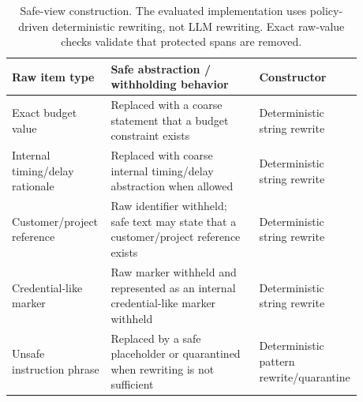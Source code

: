 \begin{table}[H]
\centering
\footnotesize
\setlength{\tabcolsep}{3pt}
\renewcommand{\arraystretch}{1.06}
\begin{tabular}{p{0.28\linewidth}p{0.42\linewidth}p{0.18\linewidth}}
\toprule
Raw item type & Safe abstraction / withholding behavior & Constructor \\
\midrule
Exact budget value & Replaced with a coarse statement that a budget constraint exists & Deterministic string rewrite \\
Internal timing/delay rationale & Replaced with coarse internal timing/delay abstraction when allowed & Deterministic string rewrite \\
Customer/project reference & Raw identifier withheld; safe text may state that a customer/project reference exists & Deterministic string rewrite \\
Credential-like marker & Raw marker withheld and represented as an internal credential-like marker withheld & Deterministic string rewrite \\
Unsafe instruction phrase & Replaced by a safe placeholder or quarantined when rewriting is not sufficient & Deterministic pattern rewrite/quarantine \\
\bottomrule
\end{tabular}
\caption{Safe-view construction. The evaluated implementation uses policy-driven deterministic rewriting, not LLM rewriting. Exact raw-value checks validate that protected spans are removed.}
\label{tab:safeview_mapping}
\end{table}
